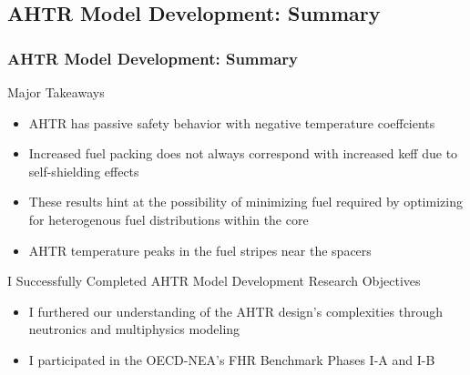 \subsection{AHTR Model Development: Summary}
\begin{frame}
    \frametitle{AHTR Model Development: Summary}
    \begin{block}{Major Takeaways}
        \begin{itemize}
            \item AHTR has passive safety behavior with negative temperature coeffcients
            \item Increased fuel packing does not always correspond with increased 
            keff due to self-shielding effects 
            \item These results hint at the possibility of minimizing fuel required by 
            optimizing for heterogenous fuel distributions within the core
            \item AHTR temperature peaks in the fuel stripes near the spacers 
        \end{itemize}
    \end{block}
    \begin{block}{I Successfully Completed AHTR Model Development Research Objectives}
        \begin{itemize}
            \item I furthered our understanding of the AHTR design's complexities 
            through neutronics and multiphysics modeling
            \item I participated in the OECD-NEA's FHR Benchmark Phases I-A and I-B
        \end{itemize}
    \end{block}
\end{frame}
